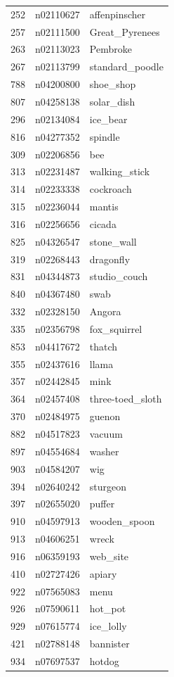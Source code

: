 \begin{table}
\begin{tabular}{cll}
252 & n02110627 & affenpinscher \\
257 & n02111500 & Great_Pyrenees \\
263 & n02113023 & Pembroke \\
267 & n02113799 & standard_poodle \\
788 & n04200800 & shoe_shop \\
807 & n04258138 & solar_dish \\
296 & n02134084 & ice_bear \\
816 & n04277352 & spindle \\
309 & n02206856 & bee \\
313 & n02231487 & walking_stick \\
314 & n02233338 & cockroach \\
315 & n02236044 & mantis \\
316 & n02256656 & cicada \\
825 & n04326547 & stone_wall \\
319 & n02268443 & dragonfly \\
831 & n04344873 & studio_couch \\
840 & n04367480 & swab \\
332 & n02328150 & Angora \\
335 & n02356798 & fox_squirrel \\
853 & n04417672 & thatch \\
355 & n02437616 & llama \\
357 & n02442845 & mink \\
364 & n02457408 & three-toed_sloth \\
370 & n02484975 & guenon \\
882 & n04517823 & vacuum \\
897 & n04554684 & washer \\
903 & n04584207 & wig \\
394 & n02640242 & sturgeon \\
397 & n02655020 & puffer \\
910 & n04597913 & wooden_spoon \\
913 & n04606251 & wreck \\
916 & n06359193 & web_site \\
410 & n02727426 & apiary \\
922 & n07565083 & menu \\
926 & n07590611 & hot_pot \\
929 & n07615774 & ice_lolly \\
421 & n02788148 & bannister \\
934 & n07697537 & hotdog \\

\end{tabular}
\end{table}
